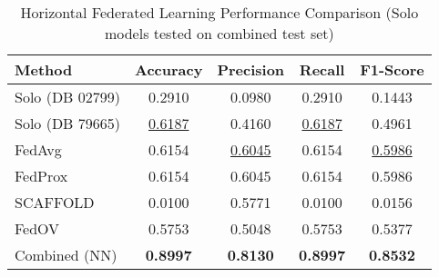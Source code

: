 \begin{table}[ht]
  \centering
  \caption{Horizontal Federated Learning Performance Comparison (Solo models tested on combined test set)}
  \label{tab:horizontal_fl_comparison}
  \begin{tabular}{lcccc}
  \toprule
  \textbf{Method} & \textbf{Accuracy} & \textbf{Precision} & \textbf{Recall} & \textbf{F1-Score} \\
  \midrule
  Solo (DB 02799) & 0.2910 & 0.0980 & 0.2910 & 0.1443 \\
  Solo (DB 79665) & \underline{0.6187} & 0.4160 & \underline{0.6187} & 0.4961 \\
  \midrule
  FedAvg & 0.6154 & \underline{0.6045} & 0.6154 & \underline{0.5986} \\
  FedProx & 0.6154 & 0.6045 & 0.6154 & 0.5986 \\
  SCAFFOLD & 0.0100 & 0.5771 & 0.0100 & 0.0156 \\
  FedOV & 0.5753 & 0.5048 & 0.5753 & 0.5377 \\
  \midrule
  Combined (NN) & \textbf{0.8997} & \textbf{0.8130} & \textbf{0.8997} & \textbf{0.8532} \\
  \bottomrule
  \end{tabular}
\end{table}
